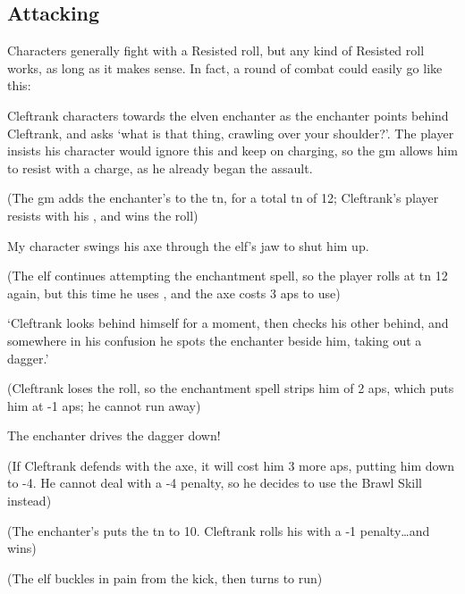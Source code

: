 \begin{multicols}{2}

\subsection{Attacking}
\label{attack}

Characters generally fight with a Resisted  roll, but any kind of Resisted roll works, as long as it makes sense.
In fact, a round of combat could easily go like this:


\begin{exampletext}
  Cleftrank characters towards the elven enchanter as the enchanter points behind Cleftrank, and asks `what is that thing, crawling over your shoulder?'.
  The player insists his character would ignore this and keep on charging, so the \gls{gm} allows him to resist with a charge, as he already began the assault.

  \small{(The \gls{gm} adds the enchanter's  to the \gls{tn}, for a total \gls{tn} of 12; Cleftrank's player resists with his , and wins the roll)}

  My character swings his axe through the elf's jaw to shut him up.

  \small{(The elf continues attempting the enchantment spell, so the player rolls at \gls{tn} 12 again, but this time he uses , and the axe costs 3 \glspl{ap} to use)}

  `Cleftrank looks behind himself for a moment, then checks his other behind, and somewhere in his confusion he spots the enchanter beside him, taking out a dagger.'

  \small{(Cleftrank loses the roll, so the enchantment spell strips him of 2 \glspl{ap}, which puts him at -1 \glspl{ap}; he cannot run away)}

  The enchanter drives the dagger down!

  \small{(If Cleftrank defends with the axe, it will cost him 3 more \glspl{ap}, putting him down to -4.
  He cannot deal with a -4 penalty, so he decides to use the Brawl Skill instead)}

  (The enchanter's  puts the \gls{tn} to 10.
  Cleftrank rolls his  with a -1 penalty\ldots and wins)

  \small{(The elf buckles in pain from the kick, then turns to run)}

\end{exampletext}


\end{multicols}
